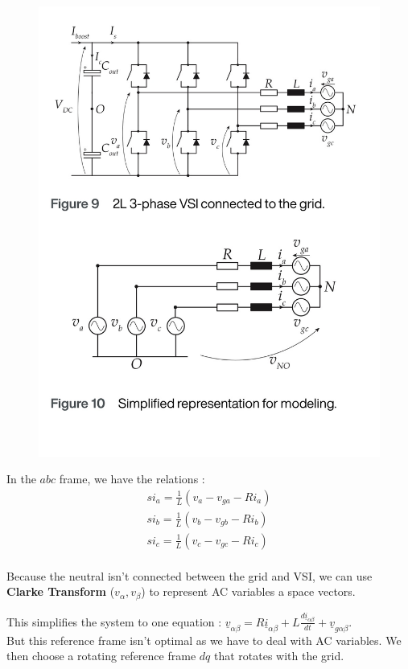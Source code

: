 \documentclass[../main.tex]{subfiles}
\begin{document}
\begin{figure}[hbt!]
    \centering
    \includegraphics[width=0.7\linewidth]{IMAGES/Indus_el/IMG_0183.jpeg}
\end{figure}

In the $abc$ frame, we have the relations : \begin{equation}
    \begin{gathered}
        si_a = \frac{1}{L}(v_a - v_{ga} - Ri_a)\\
        si_b = \frac{1}{L}(v_b - v_{gb} - Ri_b)\\
        si_c = \frac{1}{L}(v_c - v_{gc} - Ri_c)\\
    \end{gathered}
\end{equation}

Because the neutral isn't connected between the grid and VSI, we can use \textbf{Clarke Transform} ($v_\alpha, v_\beta$) to represent AC variables a space vectors.

This simplifies the system to one equation : $\underline{v}_{\alpha\beta} = R \underline{i}_{\alpha\beta} + L\frac{d \underline{i}_{\alpha \beta}}{dt}+ \underline{v}_{g\alpha \beta}$.\\

But this reference frame isn't optimal as we have to deal with AC variables. We then choose a rotating reference frame $dq$ that rotates with the grid.\\
\end{document}

